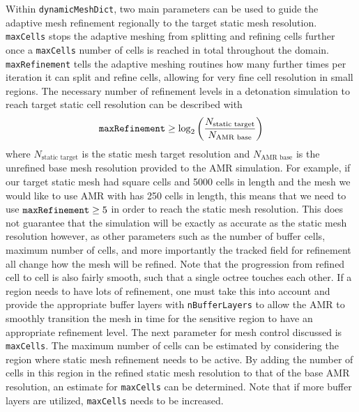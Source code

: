 Within \verb|dynamicMeshDict|, two main parameters can be used to guide the adaptive mesh refinement regionally to the target static mesh resolution. \verb|maxCells| stops the adaptive meshing from splitting and refining cells further once a \verb|maxCells| number of cells is reached in total throughout the domain. \verb|maxRefinement| tells the adaptive meshing routines how many further times per iteration it can split and refine cells, allowing for very fine cell resolution in small regions. The necessary number of refinement levels in a detonation simulation to reach target static cell resolution can be described with 
\begin{equation}
\verb|maxRefinement| \geq \log_2\left(\frac{N_{\text{static target}}}{N_{\text{AMR base}}}\right)
\end{equation}
where \(N_{\text{static target}}\) is the static mesh target resolution and \(N_{\text{AMR base}}\) is the unrefined base mesh resolution provided to the AMR simulation. For example, if our target static mesh had square cells and 5000 cells in length and the mesh we would like to use AMR with has 250 cells in length, this means that we need to use \(\verb|maxRefinement|\geq 5\) in order to reach the static mesh resolution. This does not guarantee that the simulation will be exactly as accurate as the static mesh resolution however, as other parameters such as the number of buffer cells, maximum number of cells, and more importantly the tracked field for refinement all change how the mesh will be refined. Note that the progression from refined cell to cell is also fairly smooth, such that a single octree touches each other. If a region needs to have lots of refinement, one must take this into account and provide the appropriate buffer layers with \verb|nBufferLayers| to allow the AMR to smoothly transition the mesh in time for the sensitive region to have an appropriate refinement level. The next parameter for mesh control discussed is \verb|maxCells|. 
The maximum number of cells can be estimated by considering the region where static mesh refinement needs to be active. By adding the number of cells in this region in the refined static mesh resolution to that of the base AMR resolution, an estimate for \verb|maxCells| can be determined. Note that if more buffer layers are utilized, \verb|maxCells| needs to be increased. 




